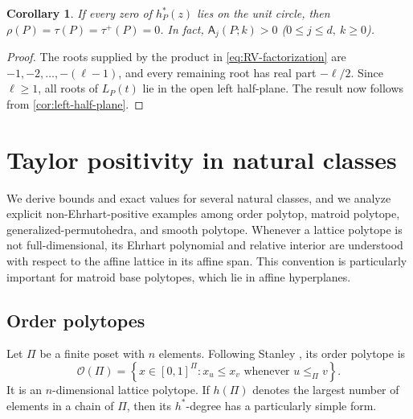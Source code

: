 \documentclass[reqno, 12pt]{article}
\numberwithin{equation}{section}
\newtheorem{corollary}[theorem]{Corollary}
\theoremstyle{definition}
\newcommand{\A}{\mathsf{A}}
\begin{document}
\begin{corollary}\label{cor:unit-circle-zero-center}
If every zero of $h_P^*(z)$ lies on the unit circle, then $\rho(P)=\tau(P)=\tau^+(P)=0$.
In fact, $\A_j(P;k)>0$ ($0\leq j\leq d,\ k\geq0$).
\end{corollary}
\begin{proof}
The roots supplied by the product in \eqref{eq:RV-factorization} are $-1,-2,\ldots,-(\ell-1)$,
and every remaining root has real part $-\ell/2$.  Since $\ell\geq1$, all roots of $L_P(t)$ lie in the open left half-plane.  The result now follows from \cref{cor:left-half-plane}.
\end{proof}



\section{Taylor positivity in natural classes}
\label{sec:natural-classes}

We derive bounds and exact values for several natural classes, and we analyze explicit non-Ehrhart-positive examples among order polytop, matroid polytope, generalized-permutohedra, and smooth polytope.
Whenever a lattice polytope is not full-dimensional, its Ehrhart polynomial and relative interior are understood with respect to the affine lattice in its affine span. This convention is particularly important for matroid base polytopes, which lie in affine hyperplanes.


\subsection{Order polytopes}

Let $\Pi$ be a finite poset with $n$ elements.  Following Stanley
\cite{Stanley1986}, its order polytope is
\[\mathcal O(\Pi)=\left\{x\in[0,1]^\Pi:x_u\leq x_v\text{ whenever }u\leq_\Pi v\right\}.
\]
It is an $n$-dimensional lattice polytope.  If $h(\Pi)$ denotes the largest number of elements in a chain of $\Pi$, then its $h^*$-degree has a particularly simple form.
\end{document}

